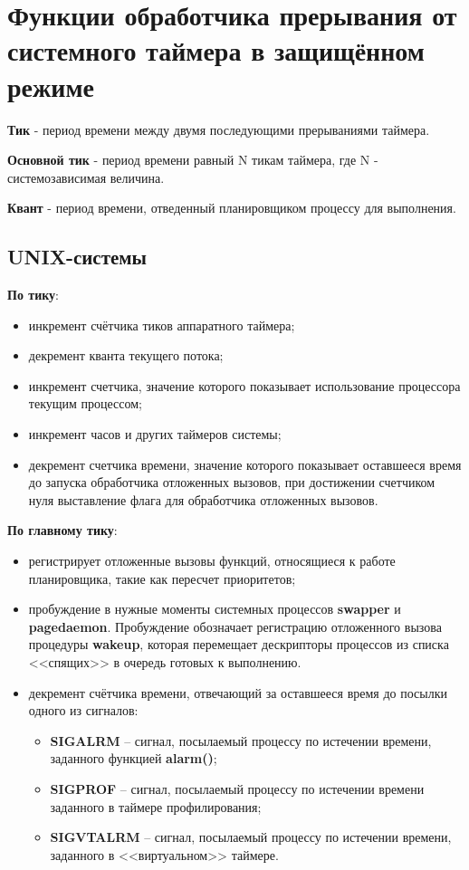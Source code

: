 \chapter{Функции обработчика прерывания от системного таймера в защищённом режиме}

\textbf{Тик} - период времени между двумя последующими прерываниями таймера.  

\textbf{Основной тик} - период времени равный N тикам таймера, где N - системозависимая величина.  

\textbf{Квант} - период времени, отведенный планировщиком процессу для выполнения.


\section{UNIX-системы}

\textbf{По тику}:

\begin{itemize}
    \item инкремент счётчика тиков аппаратного таймера;
    \item декремент кванта текущего потока;
    \item инкремент счетчика, значение которого показывает использование процессора текущим процессом;
    \item инкремент часов и других таймеров системы;
    \item декремент счетчика времени, значение которого показывает оставшееся время до запуска обработчика отложенных вызовов, при достижении счетчиком нуля выставление флага для обработчика отложенных вызовов.
\end{itemize}

\textbf{По главному тику}:

\begin{itemize}
    \item регистрирует отложенные вызовы функций, относящиеся к работе планировщика, такие как пересчет приоритетов;
    \item пробуждение в нужные моменты системных процессов \textbf{swapper} и \textbf{pagedaemon}. Пробуждение обозначает регистрацию отложенного вызова процедуры \textbf{wakeup}, которая перемещает дескрипторы процессов из списка <<спящих>> в очередь готовых к выполнению.
    \item декремент счётчика времени, отвечающий за оставшееся время до посылки одного из сигналов:
        \begin{itemize}
            \item \textbf{SIGALRM} -- сигнал, посылаемый процессу по истечении времени, заданного функцией \textbf{alarm()};
            \item \textbf{SIGPROF} -- сигнал, посылаемый процессу по истечении времени заданного в таймере профилирования;
            \item \textbf{SIGVTALRM} --  сигнал, посылаемый процессу по истечении времени, заданного в <<виртуальном>> таймере.
        \end{itemize}
\end{itemize}

